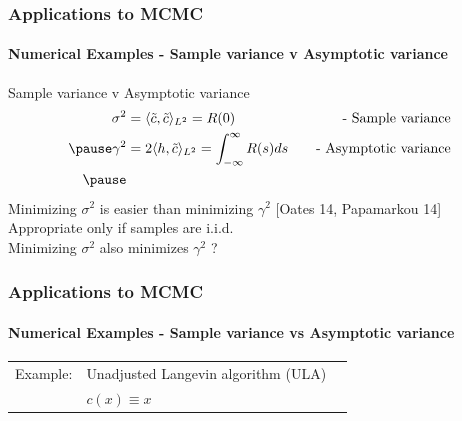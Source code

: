 \documentclass[xcolor=dvipsnames, subsection=false]{beamer}
\def\alertb#1{\alert{\color{BrickRed}  #1}}
\def\alertb#1{\alert{\color{BrickRed}  #1}}
\def\tilc{\tilde c}
\def\rd#1{{\color{red}#1}}
\def\bl#1{{\color{blue}#1}}
\begin{document}
\begin{frame}
\frametitle{Applications to MCMC}
\framesubtitle{Numerical Examples - Sample variance v Asymptotic variance}
Sample variance v Asymptotic variance
\[
\begin{aligned}
\sigma^2 &= \langle \tilc, \tilc\rangle_{L^2} = R(0) \quad &\text{- Sample variance}\\ \pause
\gamma^2 & = 2 \langle h, \tilc \rangle_{L^2}   = \int_{-\infty}^{\infty} R(s) ds \quad &\text{- Asymptotic variance} \\ \pause
\end{aligned}
\]
Minimizing $\sigma^2$ is easier than minimizing $\gamma^2$  {\footnotesize \bl{[Oates 14,  Papamarkou 14] }}\\[0.2cm]
Appropriate only if samples are i.i.d. \\[0.2cm]
\alertb{Minimizing $\sigma^2$ also minimizes $\gamma^2$ ?} \pause \rd{NO !}
\end{frame}

\begin{frame}
\frametitle{Applications to MCMC}
\framesubtitle{Numerical Examples - Sample variance vs Asymptotic variance}
\begin{tabular}{lll}\alertb{Example:}   & Unadjusted Langevin algorithm (ULA)
	\\ & $c(x) \equiv x$ 
\end{tabular}
\begin{figure}
	\centering
	\mbox{
}
\end{figure}
\end{frame}
\end{document}
